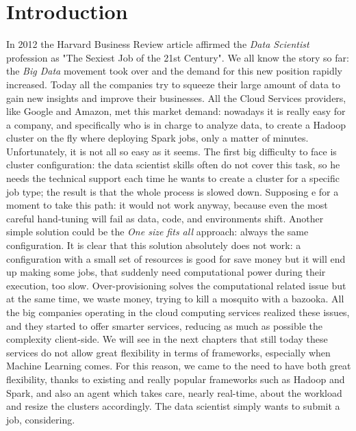 \documentclass[12pt,twoside,cucitura]{toptesi}
\begin{document}
\chapter{Introduction}
In 2012 the Harvard Business Review article \cite{hbr_2012} affirmed the \textit{Data Scientist} profession as "The Sexiest Job of the 21st Century". We all know the story so far: the \textit{Big Data} movement took over and the demand for this new position rapidly increased. Today all the companies try to squeeze their large amount of data to gain new insights and improve their businesses. All the Cloud Services providers, like Google and Amazon, met this market demand: nowadays it is really easy for a company, and specifically who is in charge to analyze data, to create a Hadoop cluster on the fly where deploying Spark jobs, only a matter of minutes. Unfortunately, it is not all so easy as it seems. The first big difficulty to face is cluster configuration: the data scientist skills often do not cover this task, so he needs the technical support each time he wants to create a cluster for a specific job type; the result is that the whole process is slowed down. Supposing e for a moment to take this path: it would not work anyway, because even the most careful hand-tuning will fail as data, code, and environments shift. Another simple solution could be the \textit{One size fits all} approach: always the same configuration. It is clear that this solution absolutely does not work: a configuration with a small set of resources is good for save money but it will end up making some jobs, that suddenly need computational power during their execution, too slow. Over-provisioning solves the computational related issue but at the same time, we waste money, trying to kill a mosquito with a bazooka. All the big companies operating in the cloud computing services realized these issues, and they started to offer smarter services, reducing as much as possible the complexity client-side.  We will see in the next chapters that still today these services do not allow great flexibility in terms of frameworks, especially when Machine Learning comes. For this reason, we came to the need to have both great flexibility, thanks to existing and really popular frameworks such as Hadoop and Spark, and also an agent which takes care, nearly real-time, about the workload and resize the clusters accordingly. The data scientist simply wants to submit a job, considering.
\end{document}
